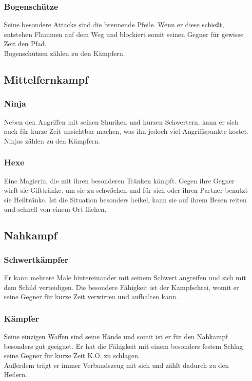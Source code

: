 \documentclass[10pt,a4paper,notitlepage]{report}
\begin{document}
\begin{flushleft}
\subsubsection{Bogenschütze}
Seine besondere Attacke sind die brennende Pfeile. Wenn er diese schießt, entstehen Flammen auf dem Weg und blockiert somit seinen Gegner für gewisse Zeit den Pfad.\\
Bogenschützen zählen zu den Kämpfern.\\
\subsection{Mittelfernkampf}
\subsubsection{Ninja}
Neben den Angriffen mit seinen Shuriken und kurzen Schwertern, kann er sich auch für kurze Zeit unsichtbar machen, was ihn jedoch viel Angriffspunkte kostet.\\
Ninjas zählen zu den Kämpfern.\\
\subsubsection{Hexe}
Eine Magierin, die mit ihren besonderen Tränken kämpft. Gegen ihre Gegner wirft sie Gifttränke, um sie zu schwächen und für sich oder ihren Partner benutzt sie Heiltränke. Ist die Situation besonders heikel, kann sie auf ihrem Besen reiten und schnell von einem Ort fliehen.\\
\subsection{Nahkampf}
\subsubsection{Schwertkämpfer}
Er kann mehrere Male hintereinander mit seinem Schwert angreifen und sich mit dem Schild verteidigen. Die besondere Fähigkeit ist der Kampfschrei, womit er seine Gegner für kurze Zeit verwirren und aufhalten kann.\\
\subsubsection{Kämpfer}
Seine einzigen Waffen sind seine Hände und somit ist er für den Nahkampf besonders gut geeignet. Er hat die Fähigkeit mit einem besonders festem Schlag seine Gegner für kurze Zeit K.O. zu schlagen.\\
Außerdem trägt er immer Verbandszeug mit sich und zählt dadurch zu den Heilern.\\

\end{flushleft}
\end{document}
